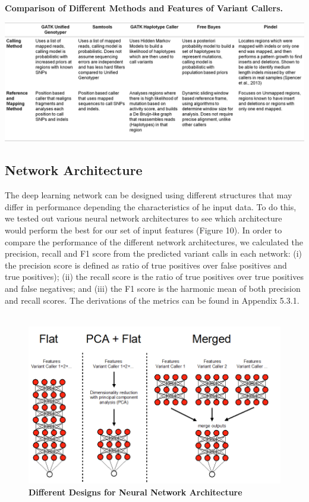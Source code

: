 \documentclass{article}
\begin{document}
\begin{table}[H]
\caption{\textbf{Comparison of Different Methods and Features of Variant Callers.}}
\includegraphics[width=\textwidth]{analysisofvariantcallers.png}
\centering
\end{table}

\subsection{Network Architecture}
The deep learning network can be designed using different structures that may differ in performance depending the characteristics of he input data.  To do this, we tested out various neural network architectures to see which architecture would perform the best for our set of input features (Figure 10). In order to compare the performance of the different network architectures, we calculated the precision, recall and F1 score from the predicted variant calls in each network: (i) the precision score is defined as ratio of true positives over false positives and true positives); (ii) the recall score is the ratio of true positives over true positives and false negatives; and (iii) the F1 score is the harmonic mean of both precision and recall scores. The derivations of the metrics can be found in Appendix 5.3.1.\\\\ 

\begin{figure}[H]
\includegraphics[width=\textwidth]{neuralnetworkstructure.png}
\centering
\caption{\textbf{Different Designs for Neural Network Architecture}}
\end{figure}
\end{document}
